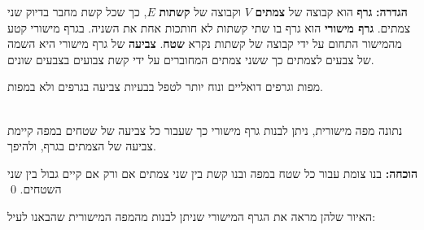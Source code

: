 \textbf{הגדרה:}
\textbf{גרף}
הוא קבוצה של 
\textbf{צמתים}
$V$
וקבוצה של 
\textbf{קשתות}
$E$,
כך שכל קשת מחבר בדיוק שני צמתים.
\textbf{גרף מישורי}
הוא גרף בו שתי קשתות לא חותכות אחת את השניה. בגרף מישורי קטע מהמישור התחום על ידי קבוצה של קשתות נקרא 
\textbf{שטח}.
\textbf{צביעה}
של גרף מישורי היא השמה של צבעים לצמתים כך ששני צמתים המחוברים על ידי קשת צבועים בצבעים שונים.

%

מפות וגרפים דואליים ונוח יותר לטפל בבעיות צביעה בגרפים ולא במפות.
\begin{theorem}\mbox{}\\
נתונה מפה מישורית, ניתן לבנות גרף מישורי כך שעבור כל צביעה של שטחים במפה קיימת צביעה של הצמתים בגרף, ולהיפך.
\end{theorem}

\textbf{הוכחה:}
בנו צומת עבור כל שטח במפה ובנו קשת בין שני צמתים אם ורק אם קיים גבול בין שני השטחים.
\qed

האיור שלהן
מראה את הגרף המישורי שניתן לבנות מהמפה המישורית שהבאנו לעיל:


